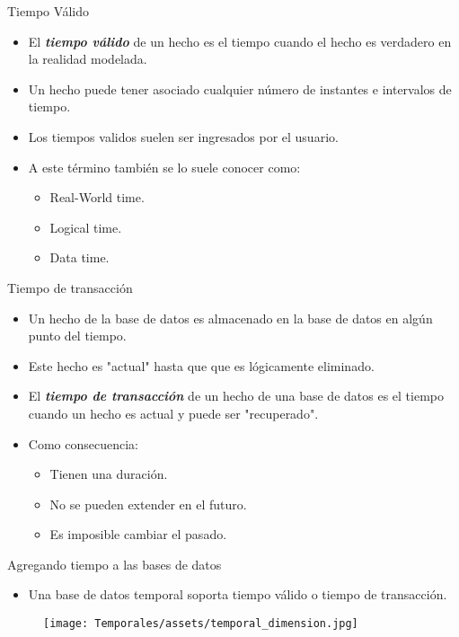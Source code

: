 \documentclass[handout, t, aspectratio=169]{beamer}
\begin{document}
\begin{frame}{Tiempo Válido}
    \begin{itemize}
        \item El \textbf{\textit{tiempo válido}} de un hecho es el tiempo cuando el hecho es verdadero en la realidad modelada.\pause
        \item Un hecho puede tener asociado cualquier número de instantes e intervalos de tiempo.\pause
        \item Los tiempos validos suelen ser ingresados por el usuario.\pause
        \item A este término también se lo suele conocer como:
        \begin{itemize}
            \item Real-World time.\pause
            \item Logical time.\pause
            \item Data time.
        \end{itemize}
    \end{itemize}
\end{frame}

\begin{frame}{Tiempo de transacción}
    \begin{itemize}
        \item Un hecho de la base de datos es almacenado en la base de datos en algún punto del tiempo.\pause
        \item Este hecho es "actual" hasta que que es lógicamente eliminado.\pause
        \item El \textit{\textbf{tiempo de transacción}} de un hecho de una base de datos es el tiempo cuando un hecho es actual y puede ser "recuperado".\pause
        \item Como consecuencia:\pause
        \begin{itemize}
            \item Tienen una duración.\pause
            \item No se pueden extender en el futuro.\pause
            \item Es imposible cambiar el pasado.
        \end{itemize}
    \end{itemize}
\end{frame}

\begin{frame}{Agregando tiempo a las bases de datos}
    \begin{itemize}
        \item Una base de datos temporal soporta tiempo válido o tiempo de transacción.
    \end{itemize}\pause
    \begin{figure}
        \centering
        \texttt{[image: Temporales/assets/temporal\_dimension.jpg]}
    \end{figure}
\end{frame}
\end{document}

